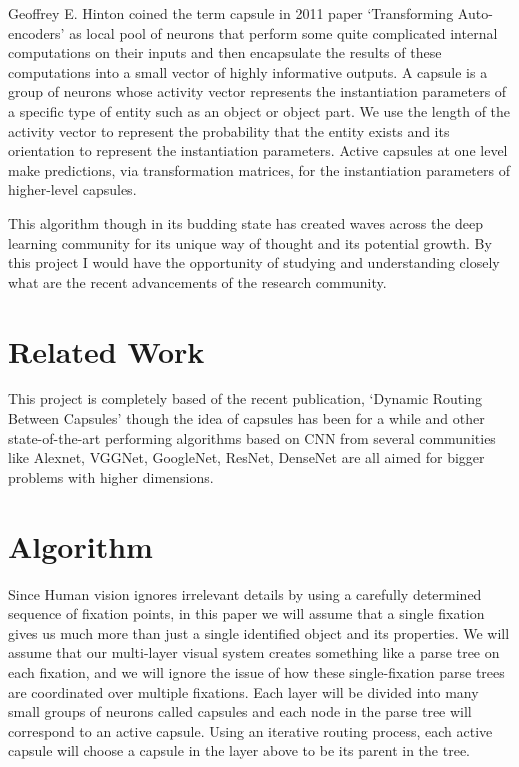 \documentclass[10pt,twocolumn,letterpaper]{article}
\begin{document}
Geoffrey E. Hinton coined the term capsule in 2011 paper `Transforming Auto-encoders' as local pool of neurons that perform some quite complicated internal computations on their inputs and then encapsulate the results of these computations into a small vector of highly informative outputs. A capsule is a group of neurons whose activity vector represents the instantiation parameters of a specific type of entity such as an object or object part. We use the length of the activity vector to represent the probability that the entity exists and its orientation to represent the instantiation parameters. Active capsules at one level make predictions, via transformation matrices, for the instantiation parameters of higher-level capsules.

This algorithm though in its budding state has created waves across the deep learning community for its unique way of thought and its potential growth. By this project I would have the opportunity of studying and understanding closely what are the recent advancements of the research community.




\section{Related Work}
This project is completely based of the recent publication, `Dynamic Routing Between Capsules'\cite{dynamicRouting} though the idea of capsules has been for a while and other state-of-the-art performing algorithms based on CNN from several communities like Alexnet, VGGNet, GoogleNet, ResNet, DenseNet are all aimed for bigger problems with higher dimensions.

\section{Algorithm}
Since Human vision ignores irrelevant details by using a carefully determined sequence of fixation points, in this paper we will assume that a single fixation gives us much more than just a single identified object and its properties. We will assume that our multi-layer visual system creates something like a parse tree on each fixation, and we will ignore the issue of how these single-fixation parse trees are coordinated over multiple fixations. Each layer will be divided into many small groups of neurons called capsules and each node in the parse tree will correspond to an active capsule. Using an iterative routing process, each active capsule will choose a capsule in the layer above to be its parent in the tree.\\
\end{document}

